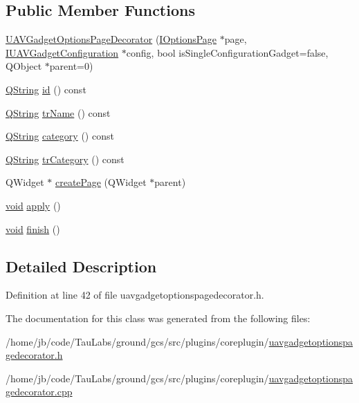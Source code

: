 \subsection*{\-Public \-Member \-Functions}
\begin{DoxyCompactItemize}
\item 
\hyperlink{group___core_plugin_gaf8ec05a3c48d283230164bdaf3c7a8fe}{\-U\-A\-V\-Gadget\-Options\-Page\-Decorator} (\hyperlink{class_core_1_1_i_options_page}{\-I\-Options\-Page} $\ast$page, \hyperlink{class_core_1_1_i_u_a_v_gadget_configuration}{\-I\-U\-A\-V\-Gadget\-Configuration} $\ast$config, bool is\-Single\-Configuration\-Gadget=false, \-Q\-Object $\ast$parent=0)
\item 
\hyperlink{group___u_a_v_objects_plugin_gab9d252f49c333c94a72f97ce3105a32d}{\-Q\-String} \hyperlink{group___core_plugin_ga7240cafa8bad2bf375cff77304850e8e}{id} () const 
\item 
\hyperlink{group___u_a_v_objects_plugin_gab9d252f49c333c94a72f97ce3105a32d}{\-Q\-String} \hyperlink{group___core_plugin_ga5b81ed9dcb5ba6fb5fdc2eb159691daa}{tr\-Name} () const 
\item 
\hyperlink{group___u_a_v_objects_plugin_gab9d252f49c333c94a72f97ce3105a32d}{\-Q\-String} \hyperlink{group___core_plugin_ga968cb1e30ffd33403e86e841b2cad4d3}{category} () const 
\item 
\hyperlink{group___u_a_v_objects_plugin_gab9d252f49c333c94a72f97ce3105a32d}{\-Q\-String} \hyperlink{group___core_plugin_ga3ef0a5ecd73cef99a1324885b89f4067}{tr\-Category} () const 
\item 
\-Q\-Widget $\ast$ \hyperlink{group___core_plugin_gab8804bee79b07efb8560f4b531b41097}{create\-Page} (\-Q\-Widget $\ast$parent)
\item 
\hyperlink{group___u_a_v_objects_plugin_ga444cf2ff3f0ecbe028adce838d373f5c}{void} \hyperlink{group___core_plugin_gaac8852aaf0ebbfa2adb09c436d7c5968}{apply} ()
\item 
\hyperlink{group___u_a_v_objects_plugin_ga444cf2ff3f0ecbe028adce838d373f5c}{void} \hyperlink{group___core_plugin_ga11f37f916e89f6d50487cf49dce75e4e}{finish} ()
\end{DoxyCompactItemize}


\subsection{\-Detailed \-Description}


\-Definition at line 42 of file uavgadgetoptionspagedecorator.\-h.



\-The documentation for this class was generated from the following files\-:\begin{DoxyCompactItemize}
\item 
/home/jb/code/\-Tau\-Labs/ground/gcs/src/plugins/coreplugin/\hyperlink{uavgadgetoptionspagedecorator_8h}{uavgadgetoptionspagedecorator.\-h}\item 
/home/jb/code/\-Tau\-Labs/ground/gcs/src/plugins/coreplugin/\hyperlink{uavgadgetoptionspagedecorator_8cpp}{uavgadgetoptionspagedecorator.\-cpp}\end{DoxyCompactItemize}
